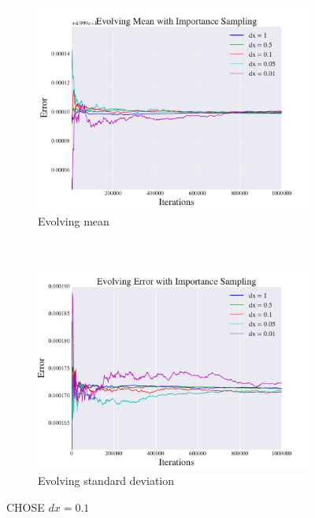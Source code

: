 \documentclass[a4paper, 10pt]{article}
\begin{document}
\begin{figure}[ht!]
	\centering
	\begin{subfigure}[b]{0.8\textwidth}
		\centering
		\includegraphics[width=\textwidth]{../Results/dx_importance_mean.pdf}
		\caption{Evolving mean}
	\end{subfigure}
	~
	\begin{subfigure}[b]{0.8\textwidth}
		\centering
		\includegraphics[width=\textwidth]{../Results/dx_importance.pdf}
		\caption{Evolving standard deviation}
	\end{subfigure}
	\caption{CHOSE $dx=0.1$}\label{fig:results_benchmark_importance}
\end{figure}
\end{document}
